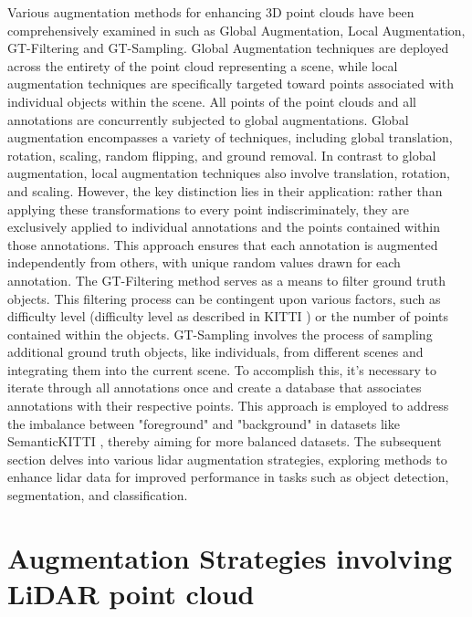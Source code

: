 Various augmentation methods for enhancing 3D point clouds have been comprehensively examined in \parencite{DBLP:journals/corr/abs-2004-01643} such as Global Augmentation, Local Augmentation, GT-Filtering and GT-Sampling.
Global Augmentation techniques are deployed across the entirety of the point cloud representing a scene, while local augmentation techniques are specifically targeted toward points associated with individual objects within the scene. All points of the point clouds and all annotations are concurrently subjected to global augmentations. Global augmentation encompasses a variety of techniques, including global translation, rotation, scaling, random flipping, and ground removal. In contrast to global augmentation, local augmentation techniques also involve translation, rotation, and scaling. However, the key distinction lies in their application: rather than applying these transformations to every point indiscriminately, they are exclusively applied to individual annotations and the points contained within those annotations. This approach ensures that each annotation is augmented independently from others, with unique random values drawn for each annotation. The GT-Filtering method serves as a means to filter ground truth objects. This filtering process can be contingent upon various factors, such as difficulty level (difficulty level as described in KITTI \parencite{Geiger2012CVPR}) or the number of points contained within the objects. GT-Sampling involves the process of sampling additional ground truth objects, like individuals, from different scenes and integrating them into the current scene. To accomplish this, it's necessary to iterate through all annotations once and create a database that associates annotations with their respective points. This approach is employed to address the imbalance between "foreground" and "background" in datasets like SemanticKITTI \parencite{behley2019semantickitti}, thereby aiming for more balanced datasets. The subsequent section delves into various lidar augmentation strategies, exploring methods to enhance lidar data for improved performance in tasks such as object detection, segmentation, and classification.

\section{Augmentation Strategies involving LiDAR point cloud}

